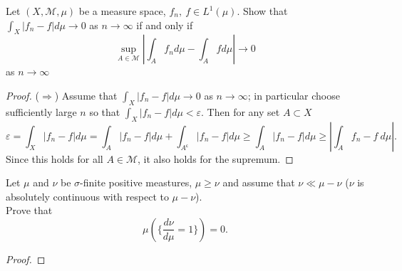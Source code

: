 \documentclass{article}
\newenvironment{problem}[2][Problem]{\begin{trivlist}
\item[\hskip \labelsep {\bfseries #1}\hskip \labelsep {\bfseries #2.}]}{\end{trivlist}}
\begin{document}
\pagebreak

\begin{problem}{3}
  Let $(X, \mathcal{M}, \mu)$ be a measure space, $f_n,\ f \in L^1(\mu)$.
  Show that $\int_X |f_n - f| d\mu \rightarrow 0$ as $n \rightarrow \infty$
  if and only if \[
    \sup_{A\in\mathcal{M}} \left|\int_A f_n d\mu - \int_A f d\mu \right| \rightarrow 0
  \] as $n \rightarrow \infty$
\end{problem}

\begin{proof}
  ($\Longrightarrow$)
  Assume that $\int_X |f_n - f| d\mu \rightarrow 0$
  as $n \rightarrow \infty$; in particular choose sufficiently large $n$ so that
  $\int_X |f_n - f| d\mu < \varepsilon$. Then for any set $A \subset X$ \[
    \varepsilon =
    \int_X |f_n - f| d\mu =
    \int_A |f_n - f| d\mu +
    \int_{A^{\mathsf{c}}} |f_n - f| d\mu \geq
    \int_A |f_n - f| d\mu \geq
    \left| \int_A f_n - f\ d\mu \right|.
  \]
  Since this holds for all $A\in\mathcal{M}$, it also holds for the supremum.
\end{proof}

\pagebreak

\begin{problem}{4}
  Let $\mu$ and $\nu$ be $\sigma$-finite positive meastures, $\mu \geq \nu$
  and assume that $\nu \ll \mu - \nu$ ($\nu$ is absolutely continuous with
  respect to $\mu - \nu$). \\
  Prove that \[
    \mu\left(\{\frac{d\nu}{d\mu} = 1\}\right) = 0.
  \]
\end{problem}

\begin{proof}
\end{proof}
\end{document}

